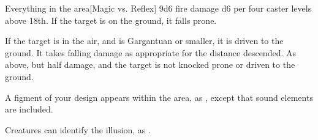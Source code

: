 \begin{spellheader}
    \spellrng{\rnglong}
\end{spellheader}
\begin{spelleffects}
    \begin{spelltargets}{Everything in the area}[Magic vs. Reflex]
        \spellsuccess 9d6 fire damage \add d6 per four caster levels above 18th. If the target is on the ground, it falls prone.

        If the target is in the air, and is Gargantuan or smaller, it is driven to the ground. It takes falling damage as appropriate for the distance descended.
        \spellfailure As above, but half damage, and the target is not knocked prone or driven to the ground.
    \end{spelltargets}
\end{spelleffects}
\begin{spellfooter}
    \spellnotes \firespellnotes

    \destructivespellnotes
\end{spellfooter}

\begin{spellheader}
    \spelldur{\durshort}
\end{spellheader}
\begin{spelleffects}
    \spelleffect A figment of your design appears within the area, as , except that sound elements are included.
\end{spelleffects}
\begin{spellfooter}
    \spellnotes Creatures can identify the illusion, as .
\end{spellfooter}

